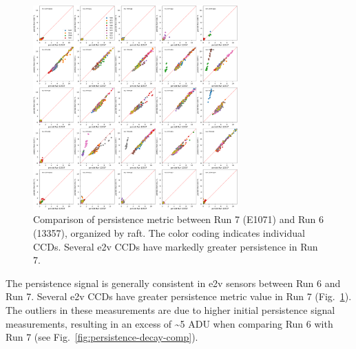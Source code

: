 \begin{figure}[H]
\begin{centering}
\includegraphics[width=0.7\textwidth]{sections/figures/baselineCharacterization/13557_E1071_persist.png}
\caption{Comparison of persistence metric between Run 7 (E1071) and Run 6 (13357), organized by raft.  The color coding indicates individual CCDs.  Several e2v CCDs have markedly greater persistence in Run 7.}
\label{fig:persistence-comp}
\end{centering}
\end{figure}

The persistence signal is generally consistent in e2v sensors between Run 6 and Run 7. Several
e2v CCDs have greater persistence metric value in Run 7 (Fig.~\ref{fig:persistence-comp}). The outliers in
these measurements are due to higher initial persistence signal
measurements, resulting in an excess of \textasciitilde5 ADU when
comparing Run 6 with Run 7 (see Fig.~\ref{fig:persistence-decay-comp}).


